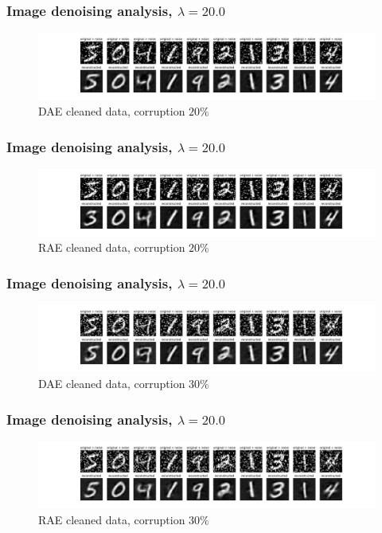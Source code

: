 \documentclass{beamer}
\theoremstyle{plain}
\theoremstyle{definition}
\theoremstyle{remark}
\begin{document}
\begin{frame}
	\frametitle{Image denoising analysis, $\lambda=20.0$}
	\begin{figure}
		\centering
		\includegraphics[width=0.95\linewidth]{Images/lam20.0corr0.2/DAE_recon.png}
		\caption[]{DAE cleaned data, corruption $20\%$}
	\end{figure}
\end{frame}

\begin{frame}
	\frametitle{Image denoising analysis, $\lambda=20.0$}
	\begin{figure}
		\centering
		\includegraphics[width=0.95\linewidth]{Images/lam20.0corr0.2/RAE_recon.png}
		\caption[]{RAE cleaned data, corruption $20\%$}
	\end{figure}
\end{frame}

\begin{frame}
	\frametitle{Image denoising analysis, $\lambda=20.0$}
	\begin{figure}
		\centering
		\includegraphics[width=0.95\linewidth]{Images/lam20.0corr0.3/DAE_recon.png}
		\caption[]{DAE cleaned data, corruption $30\%$}
	\end{figure}
\end{frame}

\begin{frame}
	\frametitle{Image denoising analysis, $\lambda=20.0$}
	\begin{figure}
		\centering
		\includegraphics[width=0.95\linewidth]{Images/lam20.0corr0.3/RAE_recon.png}
		\caption[]{RAE cleaned data, corruption $30\%$}
	\end{figure}
\end{frame}
\end{document}
